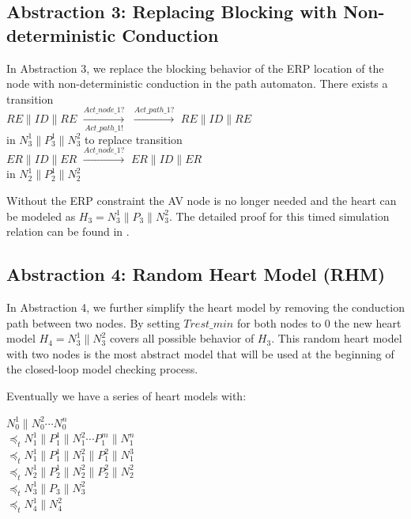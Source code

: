 \subsection{Abstraction 3: Replacing Blocking with Non-deterministic Conduction}
In Abstraction 3, we replace the blocking behavior of the \textsf{ERP} location of the node with non-deterministic conduction in the path automaton. There exists a transition\\ 
$RE\| ID\| RE$ 
$\xrightarrow[Act\_path\_1!]{Act\_node\_1?}$ 
$\xrightarrow{Act\_path\_1?}$ 
$RE\| ID\| RE$\\
in $N_3^1\| P_3^1\| N_3^2$ to replace transition\\
$ER\| ID\| ER$ 
$\xrightarrow{Act\_node\_1?}$ 
$ER\| ID\| ER$\\
in $N_2^1\| P_2^1\| N_2^2$

Without the ERP constraint the AV node is no longer needed and the heart can be modeled as $H_3=N_3^1\| P_3\| N_3^2$.  The detailed proof for this timed simulation relation can be found in \cite{STTT13}. 
\subsection{Abstraction 4: Random Heart Model (RHM)}
In Abstraction 4, we further simplify the heart model by removing the conduction path between two nodes. By setting $Trest\_min$ for both nodes to 0 the new heart model $H_4=N_3^1\|N_3^2$ covers all possible behavior of $H_3$. This random heart model with two nodes is the most abstract model that will be used at the beginning of the closed-loop model checking process.

Eventually we have a series of heart models with:

$N_0^1\|N_0^2\cdots N_0^n$\\
$\preceq_t N_1^1\|P_1^1\|N_1^2\cdots P_1^{m}\|N_1^n$\\
$\preceq_t N_1^1\| P_1^1 \| N_1^2\| P_1^2 \| N_1^3$\\
$\preceq_t N_2^1\| P_2^1\| N_2^2\| P_2^2\| N_2^2$\\
$\preceq_t N_3^1\| P_3\| N_3^2$\\
$\preceq_t N_4^1\| N_4^2$

